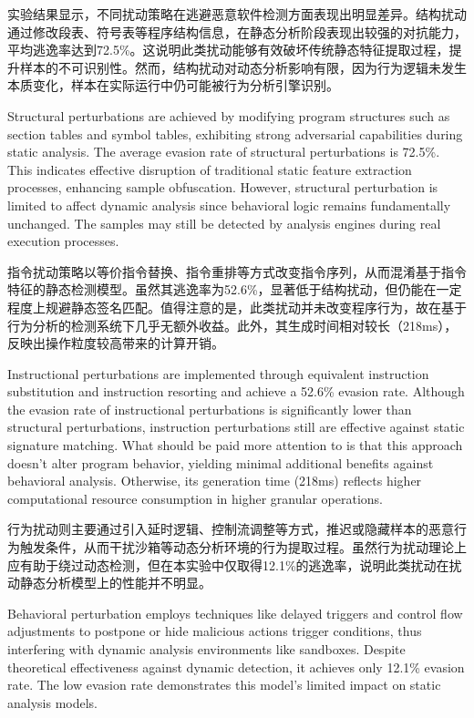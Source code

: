 实验结果显示，不同扰动策略在逃避恶意软件检测方面表现出明显差异。结构扰动通过修改段表、符号表等程序结构信息，在静态分析阶段表现出较强的对抗能力，平均逃逸率达到72.5\%。这说明此类扰动能够有效破坏传统静态特征提取过程，提升样本的不可识别性。然而，结构扰动对动态分析影响有限，因为行为逻辑未发生本质变化，样本在实际运行中仍可能被行为分析引擎识别。

Structural perturbations are achieved by modifying program structures such as section tables and symbol tables, exhibiting strong adversarial capabilities during static analysis. The average evasion rate of structural perturbations is 72.5\%. This indicates effective disruption of traditional static feature extraction processes, enhancing sample obfuscation. However, structural perturbation is limited to affect dynamic analysis since behavioral logic remains fundamentally unchanged. The samples may still be detected by analysis engines during real execution processes.

指令扰动策略以等价指令替换、指令重排等方式改变指令序列，从而混淆基于指令特征的静态检测模型。虽然其逃逸率为52.6\%，显著低于结构扰动，但仍能在一定程度上规避静态签名匹配。值得注意的是，此类扰动并未改变程序行为，故在基于行为分析的检测系统下几乎无额外收益。此外，其生成时间相对较长（218ms），反映出操作粒度较高带来的计算开销。

Instructional perturbations are implemented through equivalent instruction substitution and instruction resorting and achieve a 52.6\% evasion rate. Although the evasion rate of instructional perturbations is significantly lower than structural perturbations, instruction perturbations still are effective against static signature matching. What should be paid more attention to is that this approach doesn't alter program behavior, yielding minimal additional benefits against behavioral analysis. Otherwise, its generation time (218ms) reflects higher computational resource consumption in higher granular operations.

行为扰动则主要通过引入延时逻辑、控制流调整等方式，推迟或隐藏样本的恶意行为触发条件，从而干扰沙箱等动态分析环境的行为提取过程。虽然行为扰动理论上应有助于绕过动态检测，但在本实验中仅取得12.1\%的逃逸率，说明此类扰动在扰动静态分析模型上的性能并不明显。

Behavioral perturbation employs techniques like delayed triggers and control flow adjustments to postpone or hide malicious actions trigger conditions, thus interfering with dynamic analysis environments like sandboxes. Despite theoretical effectiveness against dynamic detection, it achieves only 12.1\% evasion rate. The low evasion rate demonstrates this model's limited impact on static analysis models.

